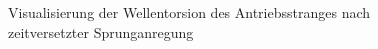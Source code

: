 \begin{figure}[H]
   \centering
   \caption[Wellentorsion Antriebsstrang]{Visualisierung der Wellentorsion des Antriebsstranges nach zeitversetzter Sprunganregung}
   \label{fig:Bild3.5}
\end{figure}